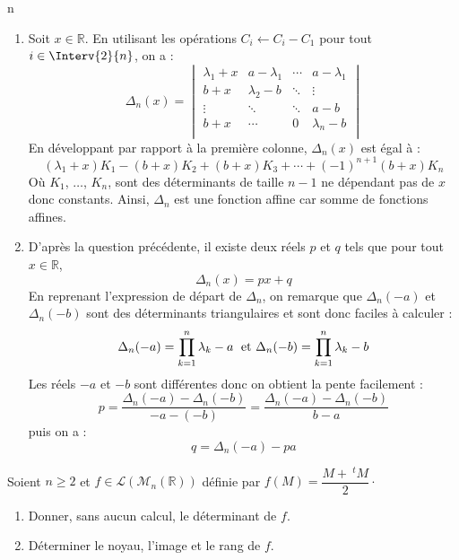 n\documentclass[a4paper,10pt]{report}
\begin{document}
\begin{enumerate}
\item Soit $x \in \mathbb{R}$. En utilisant les opérations $C_i \leftarrow C_i - C_1$ pour tout $i \in \Interv{2}{n}$, on a :
    \[
    \Delta_n(x) =
    \begin{vmatrix}
        {\lambda_1 + x} & a - \lambda_1 & \cdots & a- \lambda_1 \\
        {b + x} & \lambda_2-b & \ddots & \vdots \\
        \vdots & \ddots & \ddots & a-b \\
        {b + x} & \cdots & 0 & \lambda_n-b \\
    \end{vmatrix}    
    \]
En développant par rapport à la première colonne, $\Delta_n(x)$ est égal à :
$$ (\lambda_1+x) K_1 - (b+x) K_2 + (b+x) K_3 + \cdots + (-1)^{n+1} (b+x) K_n$$
Où $K_1$, $\ldots$, $K_n$, sont des déterminants de taille $n-1$ ne dépendant pas de $x$ donc constants. Ainsi, $\Delta_n$ est une fonction affine car somme de fonctions affines.
\item D'après la question précédente, il existe deux réels $p$ et $q$ tels que pour tout $x \in \mathbb{R}$,
$$ \Delta_n(x) = px + q$$
En reprenant l'expression de départ de $\Delta_n$, on remarque que $\Delta_n(-a)$ et $\Delta_n(-b)$ sont des déterminants triangulaires et sont donc faciles à calculer :
$$ \Delta_n(-a) = \prod_{k=1}^n \lambda_k - a \; \hbox{ et } \Delta_n(-b) = \prod_{k=1}^n \lambda_k - b$$
Les réels $-a$ et $-b$ sont différentes donc on obtient la pente facilement :
$$ p = \dfrac{\Delta_n(-a) - \Delta_n(-b)}{-a-(-b)} = \dfrac{\Delta_n(-a) - \Delta_n(-b)}{b-a}$$
puis on a :
$$ q = \Delta_n(-a) -pa$$
\end{enumerate}

\begin{Exa} Soient $n \geq 2$ et $f \in \mathcal{L}(\mathcal{M}_n(\mathbb{R}))$ définie par $f(M) = \dfrac{M+~^tM}{2}\cdot$

\begin{enumerate}
\item Donner, sans aucun calcul, le déterminant de $f$.
\item Déterminer le noyau, l'image et le rang de $f$. 
\end{enumerate}
\end{Exa}

\corr
\end{document}

